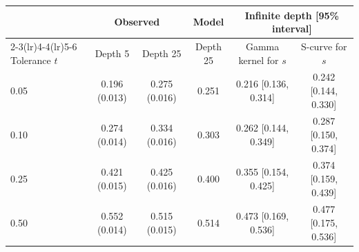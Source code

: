 \begin{tabular}{lccccc}
\toprule
 & \multicolumn{2}{c}{Observed} & Model & \multicolumn{2}{c}{Infinite depth [95\% interval]} \\
\cmidrule(lr){2-3}\cmidrule(lr){4-4}\cmidrule(lr){5-6}
Tolerance $t$ & Depth 5 & Depth 25 & Depth 25 & Gamma kernel for $s$ & S-curve for $s$ \\
\midrule
0.05 & 0.196 (0.013) & 0.275 (0.016) & 0.251 & 0.216 [0.136, 0.314] & 0.242 [0.144, 0.330] \\
0.10 & 0.274 (0.014) & 0.334 (0.016) & 0.303 & 0.262 [0.144, 0.349] & 0.287 [0.150, 0.374] \\
0.25 & 0.421 (0.015) & 0.425 (0.016) & 0.400 & 0.355 [0.154, 0.425] & 0.374 [0.159, 0.439] \\
0.50 & 0.552 (0.014) & 0.515 (0.015) & 0.514 & 0.473 [0.169, 0.536] & 0.477 [0.175, 0.536] \\
\bottomrule
\end{tabular}
